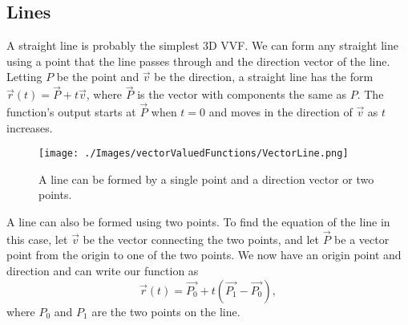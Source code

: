 \subsection{Lines}
\noindent
A straight line is probably the simplest 3D VVF. We can form any straight line using a point that the line passes through and the direction vector of the line.
Letting $P$ be the point and $\vec{v}$ be the direction, a straight line has the form $\vec{r}(t) = \vec{P}+t\vec{v}$, where $\vec{P}$ is the vector with components the same as $P$.
The function's output starts at $\vec{P}$ when $t=0$ and moves in the direction of $\vec{v}$ as $t$ increases.

\begin{figure}[H]
	\centering
	\texttt{[image: ./Images/vectorValuedFunctions/VectorLine.png]}
	\caption{A line can be formed by a single point and a direction vector or two points.}
\end{figure}

\noindent
A line can also be formed using two points.
To find the equation of the line in this case, let $\vec{v}$ be the vector connecting the two points, and let $\vec{P}$ be a vector point from the origin to one of the two points.
We now have an origin point and direction and can write our function as
\begin{equation*}
	\vec{r}(t) = \vec{P_0} + t\left(\vec{P_1} - \vec{P_0}\right),
\end{equation*}
where $P_0$ and $P_1$ are the two points on the line.